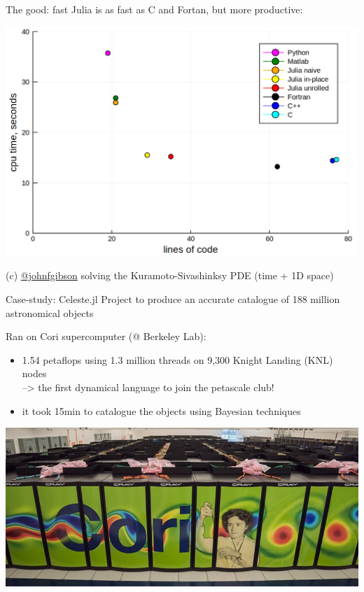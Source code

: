 \documentclass[compress,presentation,aspectratio=169]{beamer}
\begin{document}
\begin{frame}[label={sec:orgacedcb7}]{The good: fast}
  \footnotesize
Julia is as fast as C and Fortan, but more productive:

\begin{center}
\includegraphics[width=.75\linewidth]{./figs/loc-vs-speed.png}
\end{center}

(c) \href{https://github.com/johnfgibson/julia-pde-benchmark/blob/master/1-Kuramoto-Sivashinksy-benchmark.ipynb}{@johnfgibson} solving the Kuramoto-Sivashinksy PDE (time + 1D space)
\end{frame}

\begin{frame}[label={sec:org7fa5452}]{Case-study: Celeste.jl}
  \footnotesize
Project to produce an accurate catalogue of 188 million astronomical objects

Ran on Cori supercomputer (@ Berkeley Lab):
\begin{itemize}
\item 1.54 petaflops using 1.3 million threads on 9,300 Knight Landing (KNL) nodes\\
--> the first dynamical language to \alert{join the petascale club}!
\item it took 15min to catalogue the objects using Bayesian techniques
\end{itemize}


\begin{center}
\includegraphics[width=.9\linewidth]{./figs/cori.jpg}
\end{center}
\end{frame}
\end{document}
